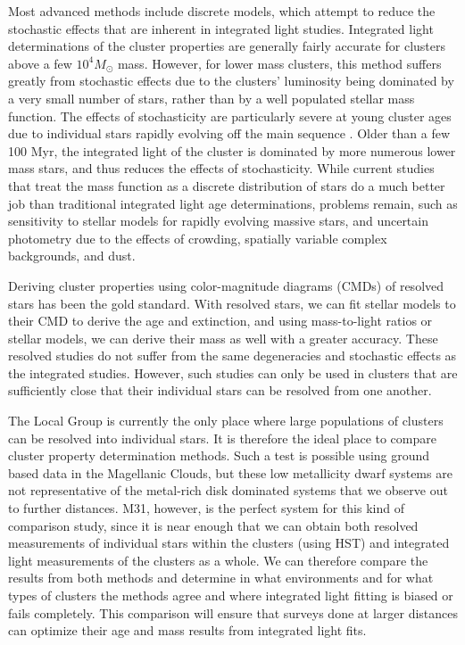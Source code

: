 \documentclass{emulateapj}
\begin{document}
Most advanced methods include discrete models, which attempt to reduce the stochastic effects that are inherent in integrated light studies.  Integrated light determinations of the cluster properties are generally fairly accurate for clusters above a few $10^4 M_{\odot}$ mass.  However, for lower mass clusters, this method suffers greatly from stochastic effects due to the clusters' luminosity being dominated by a very small number of stars, rather than by a well populated stellar mass function.  The effects of stochasticity are particularly severe at young cluster ages due to individual stars rapidly evolving off the main sequence  \citep[e.g.,][] {Lancon00, Cervino04, Apellaniz09, Piskunov09, Popescu10a, Fouesneau10, Beerman12}.  Older than a few 100 Myr, the integrated light of the cluster is dominated by more numerous lower mass stars, and thus reduces the effects of stochasticity.  While current studies that treat the mass function as a discrete distribution of stars \citep{Fouesneau12, Popescu12} do a much better job than traditional integrated light age determinations, problems remain, such as sensitivity to stellar models for rapidly evolving massive stars, and uncertain photometry due to the effects of crowding, spatially variable complex backgrounds, and dust.  

Deriving cluster properties using color-magnitude diagrams (CMDs) of resolved stars has been the gold standard.  With resolved stars, we can fit stellar models to their CMD to derive the age and extinction, and using mass-to-light ratios or stellar models, we can derive their mass as well with a greater accuracy.  These resolved studies do not suffer from the same degeneracies and stochastic effects as the integrated studies.  However, such studies can only be used in clusters that are sufficiently close that their individual stars can be resolved from one another.  

The Local Group is currently the only place where large populations of clusters can be resolved into individual stars.  It is therefore the ideal place to compare cluster property determination methods.  Such a test is possible using ground based data in the Magellanic Clouds, but these low metallicity dwarf systems are not representative of the metal-rich disk dominated systems that we observe out to further distances.  M31, however, is the perfect system for this kind of comparison study, since it is near enough that we can obtain both resolved measurements of individual stars within the clusters (using HST) and integrated light measurements of the clusters as a whole.  We can therefore compare the results from both methods and determine in what environments and for what types of clusters the methods agree and where integrated light fitting is biased or fails completely.  This comparison will ensure that surveys done at larger distances can optimize their age and mass results from integrated light fits.
\end{document}
